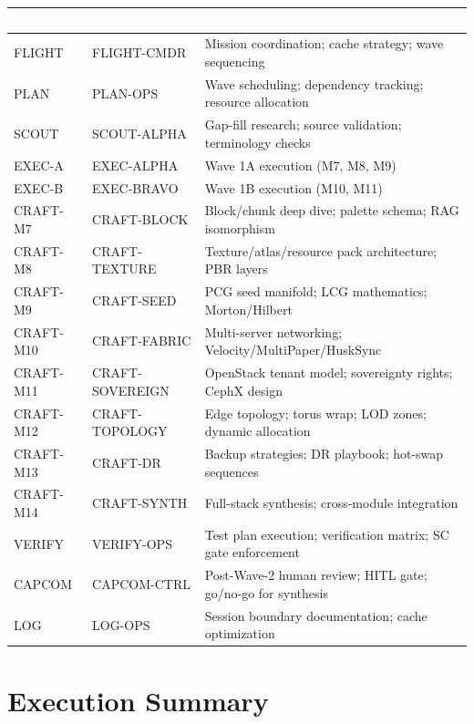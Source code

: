 \documentclass[11pt,letterpaper]{article}
\newcommand{\tableheader}[1]{\textbf{\sffamily\textcolor{white}{#1}}}
\begin{document}
\begin{center}
\begin{tabularx}{\textwidth}{L{2.5cm}L{3cm}X}
\toprule
{}
\tableheader{Role} & \tableheader{Agent} & \tableheader{Responsibility} \\
\midrule
FLIGHT & FLIGHT-CMDR & Mission coordination; cache strategy; wave sequencing \\
PLAN & PLAN-OPS & Wave scheduling; dependency tracking; resource allocation \\
SCOUT & SCOUT-ALPHA & Gap-fill research; source validation; terminology checks \\
EXEC-A & EXEC-ALPHA & Wave 1A execution (M7, M8, M9) \\
EXEC-B & EXEC-BRAVO & Wave 1B execution (M10, M11) \\
CRAFT-M7 & CRAFT-BLOCK & Block/chunk deep dive; palette schema; RAG isomorphism \\
CRAFT-M8 & CRAFT-TEXTURE & Texture/atlas/resource pack architecture; PBR layers \\
CRAFT-M9 & CRAFT-SEED & PCG seed manifold; LCG mathematics; Morton/Hilbert \\
CRAFT-M10 & CRAFT-FABRIC & Multi-server networking; Velocity/MultiPaper/HuskSync \\
CRAFT-M11 & CRAFT-SOVEREIGN & OpenStack tenant model; sovereignty rights; CephX design \\
CRAFT-M12 & CRAFT-TOPOLOGY & Edge topology; torus wrap; LOD zones; dynamic allocation \\
CRAFT-M13 & CRAFT-DR & Backup strategies; DR playbook; hot-swap sequences \\
CRAFT-M14 & CRAFT-SYNTH & Full-stack synthesis; cross-module integration \\
VERIFY & VERIFY-OPS & Test plan execution; verification matrix; SC gate enforcement \\
CAPCOM & CAPCOM-CTRL & Post-Wave-2 human review; HITL gate; go/no-go for synthesis \\
LOG & LOG-OPS & Session boundary documentation; cache optimization \\
\bottomrule
\end{tabularx}
\end{center}

\section{Execution Summary}
\end{document}
